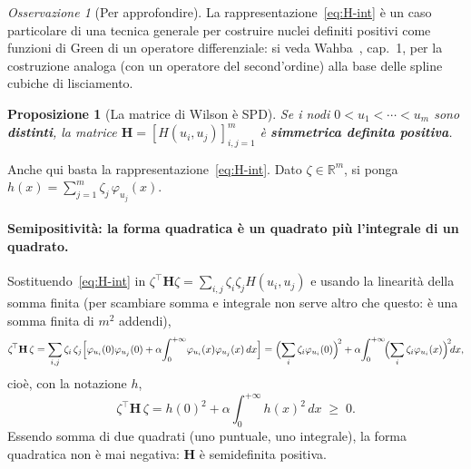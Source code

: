 \documentclass[11pt,a4paper]{article}
\theoremstyle{plain}
\newtheorem{proposizione}[teorema]{Proposizione}
\theoremstyle{definition}
\theoremstyle{remark}
\newtheorem*{osservazione}{Osservazione}
\newcommand{\Hmat}{\mathbf{H}}
\newcommand{\transp}{^{\!\top}}
\begin{document}
\begin{osservazione}[Per approfondire]
La rappresentazione~\eqref{eq:H-int} \`e un caso particolare di una tecnica generale per
costruire nuclei definiti positivi come funzioni di Green di un operatore differenziale: si
veda Wahba~\cite{wahba1990}, cap.~1, per la costruzione analoga (con un operatore del
second'ordine) alla base delle spline cubiche di lisciamento.
\end{osservazione}

\begin{proposizione}[La matrice di Wilson \`e SPD]
\label{prop:H-spd}
Se i nodi $0<u_1<\cdots<u_m$ sono \textbf{distinti}, la matrice
$\Hmat=[H(u_i,u_j)]_{i,j=1}^m$ \`e \textbf{simmetrica definita positiva}.
\end{proposizione}

Anche qui basta la rappresentazione~\eqref{eq:H-int}. Dato $\zeta\in\mathbb{R}^m$, si ponga
$h(x) = \sum_{j=1}^m \zeta_j\,\varphi_{u_j}(x)$.

\paragraph{Semipositivit\`a: la forma quadratica \`e un quadrato pi\`u l'integrale di un
quadrato.} Sostituendo~\eqref{eq:H-int} in $\zeta\transp\Hmat\zeta=\sum_{i,j}\zeta_i\zeta_j
H(u_i,u_j)$ e usando la linearit\`a della somma finita (per scambiare somma e integrale non
serve altro che questo: \`e una somma finita di $m^2$ addendi),
\[
  \zeta\transp\Hmat\,\zeta
  = \sum_{i,j}\zeta_i\,\zeta_j\Bigl[\varphi_{u_i}(0)\varphi_{u_j}(0)
    + \alpha\!\int_0^{+\infty}\!\varphi_{u_i}(x)\varphi_{u_j}(x)\,dx\Bigr]
  = \Bigl(\sum_i \zeta_i\varphi_{u_i}(0)\Bigr)^{\!2}
    + \alpha\!\int_0^{+\infty}\!\Bigl(\sum_i \zeta_i\varphi_{u_i}(x)\Bigr)^{\!2}\!dx ,
\]
cio\`e, con la notazione $h$,
\begin{equation}
  \zeta\transp\Hmat\,\zeta
  = h(0)^2 + \alpha\!\int_0^{+\infty}\! h(x)^2\,dx \;\ge\; 0 .
  \label{eq:energia-int}
\end{equation}
Essendo somma di due quadrati (uno puntuale, uno integrale), la forma quadratica non \`e mai
negativa: $\Hmat$ \`e semidefinita positiva.
\end{document}

